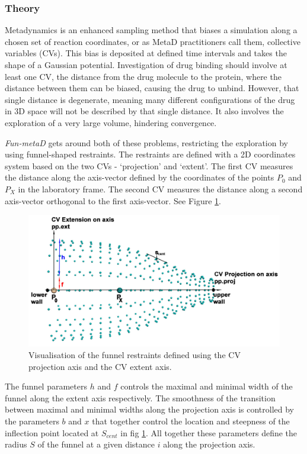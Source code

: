 \hypertarget{the-theory}{%
\subsubsection{Theory}\label{the-theory}}

Metadynamics is an enhanced sampling method that biases a simulation
along a chosen set of reaction coordinates, or as MetaD practitioners
call them, collective variables (CVs). This bias is deposited at defined
time intervals and takes the shape of a Gaussian potential.
Investigation of drug binding should involve at least one CV, the distance
from the drug molecule to the protein, where the distance between them
can be biased, causing the drug to unbind. However, that single distance
is degenerate, meaning many different configurations of the drug in 3D
space will not be described by that single distance. It also involves
the exploration of a very large volume, hindering convergence.

\emph{Fun-metaD} gets around both of these problems, restricting the
exploration by using funnel-shaped restraints. The restraints are defined with a 2D coordinates system based on the  two CVs - `projection' and `extent'. The first CV measures the distance along the axis-vector defined by the coordinates of the points $P_{0}$ and $P_{X}$ in the laboratory frame. The second CV measures the distance along a second axis-vector orthogonal to the first axis-vector. See Figure \ref{fig:funnel}. 

\begin{figure}[htp]
\includegraphics[width=\linewidth]{LIVECOMS/02_funnel_metad/funmetadfig1.jpeg}
\caption{Visualisation of the funnel restraints defined using the CV projection axis and the CV extent axis.}
\label{fig:funnel}
\end{figure}

The funnel parameters $h$ and $f$ controls the maximal and minimal width of the funnel along the extent axis respectively. The smoothness of the transition between maximal and minimal widths along the projection axis is controlled by the parameters $b$ and $x$ that together control the location and steepness of the inflection point located at $S_{cent}$ in fig \ref{fig:funnel}.  All together these parameters define the radius $S$ of the funnel at a given distance $i$ along the projection axis.  


